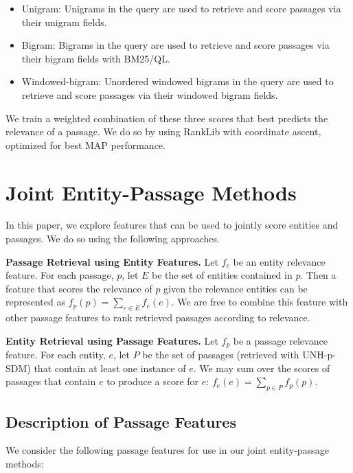 \documentclass{article}
\begin{document}
 \begin{itemize}
     \item Unigram: Unigrams in the query are used to retrieve and score passages via their unigram fields.
     \item Bigram: Bigrams in the query are used to retrieve and score passages via their bigram fields with BM25/QL.
     \item Windowed-bigram: Unordered windowed bigrams in the query are used to retrieve and score passages via their windowed bigram fields. 
 \end{itemize}
 

We train a weighted combination of these three scores that best predicts the relevance of a passage.  We do so by using RankLib with coordinate ascent, optimized for best MAP performance. 


\section{Joint Entity-Passage Methods}\label{sec:joint}


In this paper, we explore features that can be used to jointly score entities and passages. We do so using the following approaches.

\textbf{Passage Retrieval using Entity Features.} Let $f_e$ be an entity relevance feature.
For each passage, $p$, let $E$ be the set of entities contained in $p$.
Then a feature that scores the relevance of $p$ given the relevance entities can be represented as $f_p(p) = \sum_{e \in E}{f_e(e)}$. 
We are free to combine this feature with other passage features to rank retrieved passages according to relevance.

\textbf{Entity Retrieval using Passage Features.} Let $f_p$ be a passage relevance feature.
For each entity, $e$, let $P$ be the set of passages (retrieved with UNH-p-SDM) that contain at least one instance of $e$.
We may sum over the scores of passages that contain $e$ to produce a score for $e$: $f_e(e) = \sum_{p \in P}{f_p(p)}$.

\subsection{Description of Passage Features}\label{sec:jointpassage}
We consider the following passage features for use in our joint entity-passage methods:
\end{document}
